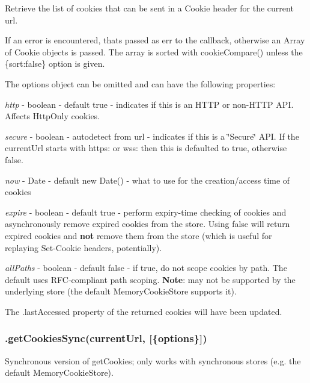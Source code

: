 Retrieve the list of cookies that can be sent in a Cookie header for the current url.

If an error is encountered, that\textquotesingle{}s passed as {\ttfamily err} to the callback, otherwise an {\ttfamily Array} of {\ttfamily Cookie} objects is passed. The array is sorted with {\ttfamily cookie\+Compare()} unless the {\ttfamily \{sort\+:false\}} option is given.

The {\ttfamily options} object can be omitted and can have the following properties\+:


\begin{DoxyItemize}
\item {\itshape http} -\/ boolean -\/ default {\ttfamily true} -\/ indicates if this is an H\+T\+TP or non-\/\+H\+T\+TP A\+PI. Affects Http\+Only cookies.
\item {\itshape secure} -\/ boolean -\/ autodetect from url -\/ indicates if this is a \char`\"{}\+Secure\char`\"{} A\+PI. If the current\+Url starts with {\ttfamily https\+:} or {\ttfamily wss\+:} then this is defaulted to {\ttfamily true}, otherwise {\ttfamily false}.
\item {\itshape now} -\/ Date -\/ default {\ttfamily new Date()} -\/ what to use for the creation/access time of cookies
\item {\itshape expire} -\/ boolean -\/ default {\ttfamily true} -\/ perform expiry-\/time checking of cookies and asynchronously remove expired cookies from the store. Using {\ttfamily false} will return expired cookies and {\bfseries not} remove them from the store (which is useful for replaying Set-\/\+Cookie headers, potentially).
\item {\itshape all\+Paths} -\/ boolean -\/ default {\ttfamily false} -\/ if {\ttfamily true}, do not scope cookies by path. The default uses R\+F\+C-\/compliant path scoping. {\bfseries Note}\+: may not be supported by the underlying store (the default {\ttfamily Memory\+Cookie\+Store} supports it).
\end{DoxyItemize}

The {\ttfamily .last\+Accessed} property of the returned cookies will have been updated.

\subsubsection*{{\ttfamily .get\+Cookies\+Sync(current\+Url, \mbox{[}\{options\}\mbox{]})}}

Synchronous version of {\ttfamily get\+Cookies}; only works with synchronous stores (e.\+g. the default {\ttfamily Memory\+Cookie\+Store}).

